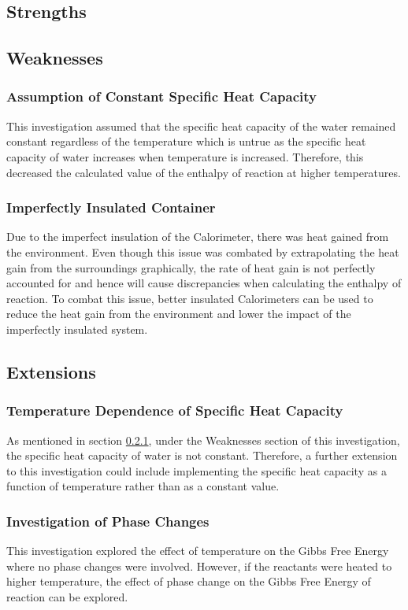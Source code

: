\documentclass{article}
\begin{document}
\subsection{Strengths}


\subsection{Weaknesses} 
\subsubsection{Assumption of Constant Specific Heat Capacity} \label{subsection1}
This investigation assumed that the specific heat capacity of the water remained constant regardless of the temperature which is untrue as the specific heat capacity of water increases when temperature is increased. Therefore, this decreased the calculated value of the enthalpy of reaction at higher temperatures.

\subsubsection{Imperfectly Insulated Container}
Due to the imperfect insulation of the Calorimeter, there was heat gained from the environment. Even though this issue was combated by extrapolating the heat gain from the surroundings graphically, the rate of heat gain is not perfectly accounted for and hence will cause discrepancies when calculating the enthalpy of reaction. To combat this issue, better insulated Calorimeters can be used to reduce the heat gain from the environment and lower the impact of the imperfectly insulated system. 

\subsection{Extensions}
\subsubsection{Temperature Dependence of Specific Heat Capacity}
As mentioned in section \ref{subsection1}, under the Weaknesses section of this investigation, the specific heat capacity of water is not constant. Therefore, a further extension to this investigation could include implementing the specific heat capacity as a function of temperature rather than as a constant value.

\subsubsection{Investigation of Phase Changes}
This investigation explored the effect of temperature on the Gibbs Free Energy where no phase changes were involved. However, if the reactants were heated to higher temperature, the effect of phase change on the Gibbs Free Energy of reaction can be explored.
\end{document}
